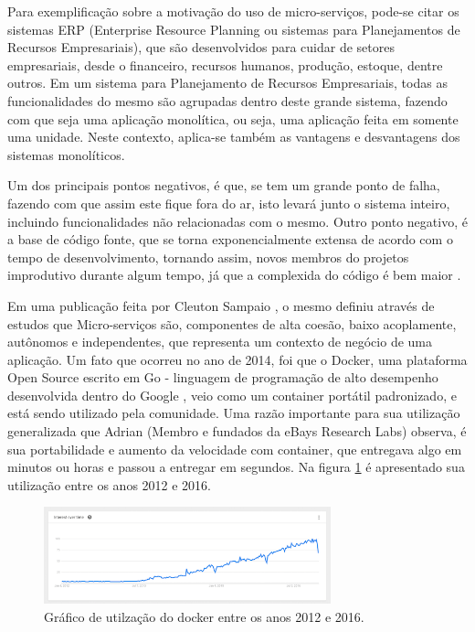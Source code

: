 \documentclass[journal]{IEEEtran}
\begin{document}
Para exemplificação sobre a motivação do uso de micro-serviços, pode-se citar os sistemas ERP (Enterprise Resource Planning ou sistemas para Planejamentos de Recursos Empresariais), que são desenvolvidos para cuidar de setores empresariais, desde o financeiro, recursos humanos, produção, estoque, dentre outros. Em um sistema para Planejamento de Recursos Empresariais, todas as funcionalidades do mesmo são agrupadas dentro deste grande sistema, fazendo com que seja uma aplicação monolítica, ou seja, uma aplicação feita em somente uma unidade. Neste contexto, aplica-se também as vantagens e desvantagens dos sistemas monolíticos.

Um dos principais pontos negativos, é que, se tem um grande ponto de falha, fazendo com que assim este fique fora do ar, isto levará junto o sistema inteiro, incluindo funcionalidades não relacionadas com o mesmo. Outro ponto negativo, é a base de código fonte, que se torna exponencialmente extensa de acordo com o tempo de desenvolvimento, tornando assim, novos membros do projetos improdutivo durante algum tempo, já que a complexida do código é bem maior \cite{AdrianoAlmeida}.

Em uma publicação feita por Cleuton Sampaio \cite{CleutonSampaio}, o mesmo definiu através de estudos que Micro-serviços são, componentes de alta coesão, baixo acoplamente, autônomos e independentes, que representa um contexto de negócio de uma aplicação. Um fato que ocorreu no ano de 2014, foi que o Docker, uma plataforma Open Source escrito em Go - linguagem de programação de alto desempenho desenvolvida dentro do Google \cite{CristianoDiedrich}, veio como um container portátil padronizado, e está sendo utilizado pela comunidade. Uma razão importante para sua utilização generalizada que Adrian (Membro e fundados da eBays Research Labs) observa, é sua portabilidade e aumento da velocidade com container, que entregava algo em minutos ou horas e passou a entregar em segundos. Na figura \ref{fig:utilizacao-docker} é apresentado sua utilização entre os anos 2012 e 2016.

\begin{figure}[h]
\centering
\includegraphics[height=1.1in]{docker}
\caption{Gráfico de utilzação do docker entre os anos 2012 e 2016.}
\label{fig:utilizacao-docker}
\end{figure}
\end{document}
